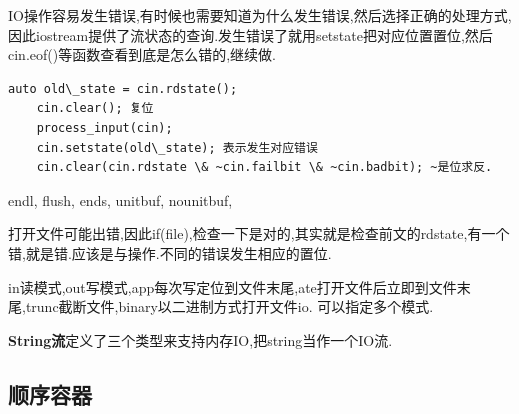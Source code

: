 IO操作容易发生错误,有时候也需要知道为什么发生错误,然后选择正确的处理方式,因此iostream提供了流状态的查询.发生错误了就用setstate把对应位置置位,然后cin.eof()等函数查看到底是怎么错的,继续做.
\begin{lstlisting}[caption={}]
	auto old\_state = cin.rdstate();
	cin.clear(); 复位
	process_input(cin);
	cin.setstate(old\_state); 表示发生对应错误
	cin.clear(cin.rdstate \& ~cin.failbit \& ~cin.badbit); ~是位求反.
\end{lstlisting}

endl, flush, ends, unitbuf, nounitbuf,

打开文件可能出错,因此if(file),检查一下是对的,其实就是检查前文的rdstate,有一个错,就是错.应该是与操作.不同的错误发生相应的置位.

in读模式,out写模式,app每次写定位到文件末尾,ate打开文件后立即到文件末尾,trunc截断文件,binary以二进制方式打开文件io. 可以指定多个模式.

\textbf{String流}定义了三个类型来支持内存IO,把string当作一个IO流.

\subsection{顺序容器}

